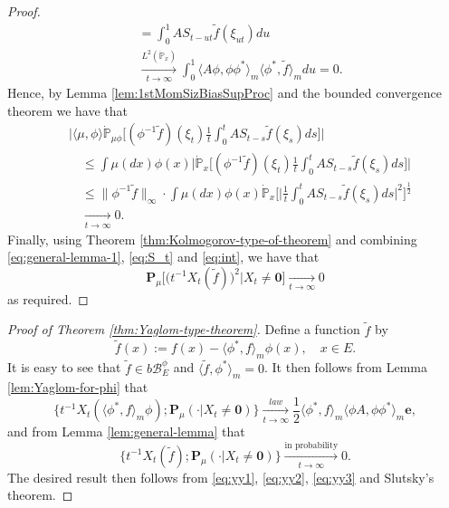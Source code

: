 \begin{proof}
\[\begin{split}
	&= \int_0^1 A S_{t-ut} \tilde f(\xi_{ut})d{u}\\
    &\xrightarrow[t\to\infty]{L^2(\dot{\mathbb P}_x)} \int_0^1\langle A\phi,\phi\phi^*\rangle_m \langle\phi^*,\tilde f\rangle_m du
	= 0.
\end{split}\]
	Hence, by Lemma \ref{lem:1stMomSizBiasSupProc} and the bounded convergence theorem we have that
\begin{equation}\label{eq:int}\begin{split}
	&\big| \langle \mu , \phi \rangle \dot{\mathbb P}_{\mu\phi}\big[(\phi^{-1}\tilde f)(\xi_t)\frac{1}{t}\int_0^t A S_{t-s} \tilde f(\xi_s)ds\big]\big|\\
	&\quad\leq \int \mu(dx)\phi(x) \big|\dot{\mathbb P}_x \big[(\phi^{-1}\tilde f)(\xi_t)\frac{1}{t}\int_0^t A S_{t-s} \tilde f(\xi_s)ds\big]\big| \\
	&\quad\leq \|\phi^{-1} \tilde f\|_\infty \cdot \int \mu(dx)\phi(x) \dot{\mathbb P}_{x}\Big[ \big| \frac{1}{t}\int_0^t A S_{t-s} \tilde f(\xi_s)ds \big|^2 \Big]^{\frac{1}{2}}\\
	&\quad \xrightarrow[t\to\infty]{} 0.
\end{split}\end{equation}
	Finally, using  Theorem \ref{thm:Kolmogorov-type-of-theorem} and combining  \eqref{eq:general-lemma-1}, \eqref{eq:S_t} and  \eqref{eq:int},   we have that
\[
	\mathbf P_{\mu}\big[\big(t^{-1}X_t(\tilde f)\big)^2\big|X_t \neq \mathbf 0\big]
	\xrightarrow[t\to\infty]{} 0
\]
	as required.
\end{proof}
\begin{proof}[Proof of Theorem \ref{thm:Yaglom-type-theorem}]
	Define a function $\tilde f$ by
\begin{equation}\label{eq:yy1}
	\tilde f(x)
	:=f(x) - \langle \phi^*,f\rangle_m \phi(x),
	\quad x\in E.
\end{equation}
	It is easy to see that $\tilde f\in b\mathscr B^\phi_E$ and $\langle\tilde f,\phi^* \rangle_m = 0$.
	It then follows from Lemma \ref{lem:Yaglom-for-phi} that
\begin{equation}\label{eq:yy2}
	\big\{ t^{-1}X_t(\langle \phi^*,f\rangle_m \phi);\mathbf P_\mu(\cdot | X_t\neq \mathbf 0)\big\}
	\xrightarrow[t\to\infty]{law} \frac{1}{2}\langle \phi^*,f\rangle_m\langle \phi A, \phi\phi^*\rangle_m \mathbf e,
\end{equation}
	and from Lemma \ref{lem:general-lemma} that
\begin{equation}\label{eq:yy3}
	\big\{ t^{-1} X_t(\tilde f) ; \mathbf P_\mu(\cdot|X_t \neq \mathbf 0)\big\}
	\xrightarrow[t\to\infty]{\text{in probability}}0.
\end{equation}
	The desired result then follows from \eqref{eq:yy1}, \eqref{eq:yy2}, \eqref{eq:yy3} and Slutsky's theorem.
\end{proof}


